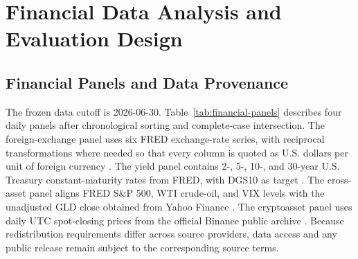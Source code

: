 \section{Financial Data Analysis and Evaluation Design}

\subsection{Financial Panels and Data Provenance}

The frozen data cutoff is 2026-06-30.
Table~\ref{tab:financial-panels} describes four daily panels after chronological sorting and complete-case intersection.
The foreign-exchange panel uses six FRED exchange-rate series, with reciprocal transformations where needed so that every column is quoted as U.S. dollars per unit of foreign currency \cite{fred}.
The yield panel contains 2-, 5-, 10-, and 30-year U.S. Treasury constant-maturity rates from FRED, with DGS10 as target \cite{fred}.
The cross-asset panel aligns FRED S\&P 500, WTI crude-oil, and VIX levels with the unadjusted GLD close obtained from Yahoo Finance \cite{fred,yahoo-gld}.
The cryptoasset panel uses daily UTC spot-closing prices from the official Binance public archive \cite{binance-data}.
Because redistribution requirements differ across source providers, data access and any public release remain subject to the corresponding source terms.

\begin{table}[t]
\centering
\caption{Frozen financial panels. Counts refer to target observations within each calendar split. Each panel defines a target-only S task and a complete-panel MS task.}
\label{tab:financial-panels}
\end{table}

